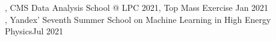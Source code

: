  




, CMS Data Analysis School @ LPC 2021, Top Mass Exercise \hfill Jan 2021 \\
, Yandex' Seventh Summer School on Machine Learning in High Energy Physics\hfill Jul 2021 \\
